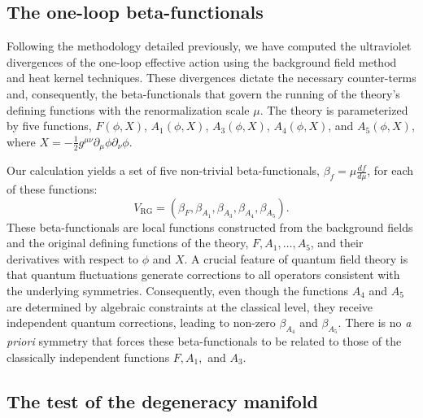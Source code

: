 \documentclass[twocolumn]{aastex631}
\begin{document}
\subsection{The one-loop beta-functionals}

Following the methodology detailed previously, we have computed the ultraviolet divergences of the one-loop effective action using the background field method and heat kernel techniques. These divergences dictate the necessary counter-terms and, consequently, the beta-functionals that govern the running of the theory's defining functions with the renormalization scale $\mu$. The theory is parameterized by five functions, $F(\phi,X)$, $A_1(\phi,X)$, $A_3(\phi,X)$, $A_4(\phi,X)$, and $A_5(\phi,X)$, where $X = - \frac{1}{2} g^{\mu\nu} \partial_\mu\phi \partial_\nu\phi$.

Our calculation yields a set of five non-trivial beta-functionals, $\beta_f = \mu \frac{df}{d\mu}$, for each of these functions:
\begin{equation}
    V_{\text{RG}} = (\beta_F, \beta_{A_1}, \beta_{A_3}, \beta_{A_4}, \beta_{A_5}).
\end{equation}
These beta-functionals are local functions constructed from the background fields and the original defining functions of the theory, $F, A_1, \dots, A_5$, and their derivatives with respect to $\phi$ and $X$. A crucial feature of quantum field theory is that quantum fluctuations generate corrections to all operators consistent with the underlying symmetries. Consequently, even though the functions $A_4$ and $A_5$ are determined by algebraic constraints at the classical level, they receive independent quantum corrections, leading to non-zero $\beta_{A_4}$ and $\beta_{A_5}$. There is no \textit{a priori} symmetry that forces these beta-functionals to be related to those of the classically independent functions $F, A_1,$ and $A_3$.

\subsection{The test of the degeneracy manifold}
\end{document}
